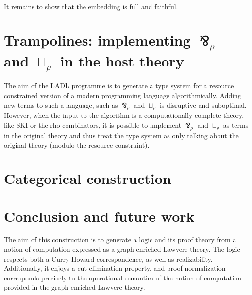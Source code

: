 \documentclass{llncs}
\renewcommand{\:}{\colon}
\begin{document}
It remains to show that the embedding is full and faithful. 

\section{Trampolines: implementing $\bindnasrepma_{\rho}$ and $\sqcup_{\rho}$ in the host theory}

The aim of the LADL programme is to generate a type system for a resource constrained version of a modern programming language algorithmically. Adding new terms to such a language, such as $\bindnasrepma_{\rho}$ and $\sqcup_{\rho}$ is disruptive and suboptimal. However, when the input to the algorithm is a computationally complete theory, like SKI or the rho-combinators, it is possible to implement $\bindnasrepma_{\rho}$ and $\sqcup_{\rho}$ as terms in the original theory and thus treat the type system as only talking about the original theory (modulo the resource constraint).

\section{Categorical construction}








\section{Conclusion and future work}

The aim of this construction is to generate a logic and its proof
theory from a notion of computation expressed as a graph-enriched
Lawvere theory. The logic respects both a Curry-Howard correspondence,
as well as realizability. Additionally, it enjoys a cut-elimination
property, and proof normalization corresponds precisely to the
operational semantics of the notion of computation provided in the
graph-enriched Lawvere theory.
\end{document}
